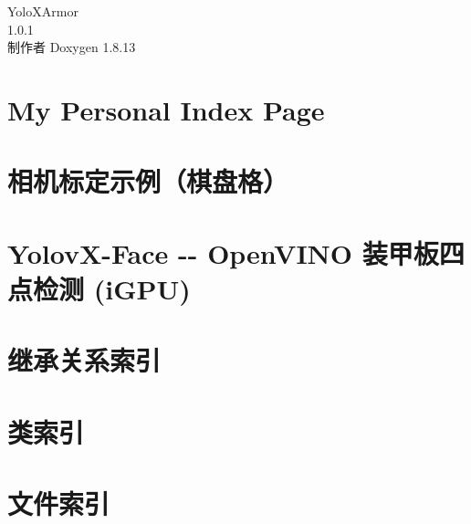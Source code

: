 \documentclass[twoside]{book}
\newcommand{\+}{\discretionary{\mbox{\scriptsize$\hookleftarrow$}}{}{}}
\newcommand{\clearemptydoublepage}{%
  \newpage{\pagestyle{empty}\cleardoublepage}%
}
\begin{document}
\hypersetup{pageanchor=false,
             bookmarksnumbered=true,
             pdfencoding=unicode
            }
\begin{titlepage}
\vspace*{7cm}
\begin{center}%
{\Large Yolo\+X\+Armor \\[1ex]\large 1.\+0.\+1 }\\
\vspace*{1cm}
{\large 制作者 Doxygen 1.8.13}\\
\end{center}
\end{titlepage}
\clearemptydoublepage
{}
\tableofcontents
\clearemptydoublepage
{}
\hypersetup{pageanchor=true}

\chapter{My Personal Index Page}
\label{index}\hypertarget{index}{}
\chapter{相机标定示例（棋盘格）}
\label{md_camera_hikvision_tool_src_calibration__xE7_x9B_xB8_xE6_x9C_xBA_xE6_xA0_x87_xE5_xAE_x9A_xE6_xAa599731361cb361bbf4529ef00b7fa89}

\chapter{Yolov\+X-\/\+Face -\/-\/ Open\+V\+I\+NO 装甲板四点检测 (i\+G\+PU)}
\label{md_readme}

\chapter{继承关系索引}

\chapter{类索引}

\chapter{文件索引}

\end{document}
